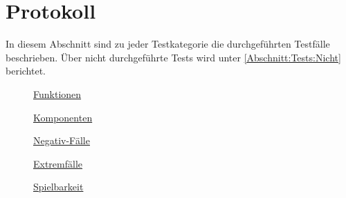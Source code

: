 %



\newpage



\section{Protokoll}
\label{Abschnitt:Tests:Protokoll}

In diesem Abschnitt sind zu jeder Testkategorie die durchgeführten Testfälle beschrieben. Über nicht durchgeführte Tests wird unter \ref*{Abschnitt:Tests:Nicht} berichtet.\\



	\begin{description}

		\item[\mousecursor]
		\hyperref[Abschnitt:Tests:Protokoll:Funktion]{Funktionen}
		
		\item[\mousecursor]
		\hyperref[Abschnitt:Tests:Protokoll:Komponenten]{Komponenten}
		
		\item[\mousecursor]
		\hyperref[Abschnitt:Tests:Protokoll:Negativ]{Negativ-Fälle}
		
		\item[\mousecursor]
		\hyperref[Abschnitt:Tests:Protokoll:Extrem]{Extremfälle}
		
		\item[\mousecursor]
		\hyperref[Abschnitt:Tests:Protokoll:Abnahme]{Spielbarkeit}
		
	\end{description}





